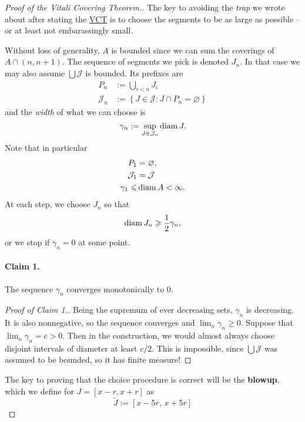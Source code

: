 \begin{proof}[Proof of the Vitali Covering Theorem.]
    The key to avoiding the \emph{trap} we wrote about after stating the \hyperlink{VitaliCoveringTheorem}{VCT} is to choose the segments to be as large as possible -- or at least not embarassingly small.

    Without loss of generality, \( A \) is bounded since we can sum the coverings of \( A \cap (n,n+1) \). The sequence of segments we pick is denoted \( J_n \). In that case we may also assume \( \bigcup \mathcal{J} \) is bounded. Its prefixes are
    \begin{align*}
        P_n &:= \bigcup_{i < n} J_i \\
        \mathcal{J}_n &:= \left\{ J \in \mathcal{J} : J \cap P_n = \varnothing \right\}
    \end{align*}
   and the \emph{width} of what we can choose is
    \[ 
        \gamma_n := \sup_{J \in \mathcal{J}_n} \operatorname{diam} J.
    \]
    Note that in particular
    \begin{align*}
        P_1 &= \varnothing, \\
        \mathcal{J}_1 &= \mathcal{J} \\
        \gamma_1 \leqslant &\operatorname{diam} A < \infty.
    \end{align*}
    At each step, we choose \( J_n \) so that
    \[ 
       \operatorname{diam} J_n \geqslant \frac{1}{2}\gamma_n,
   \]
   or we stop if \( \gamma_n = 0 \) at some point.
\paragraph{Claim 1.} The sequence \( \gamma_n \) converges monotonically to \( 0 \).
\begin{proof}[Proof of Claim 1.] Being the supremum of ever decreasing sets, \( \gamma_n \) is decreasing. It is also nonnegative, so the sequence converges and \( \lim_n \gamma_n \geqslant 0 \). Suppose that \( \lim_n \gamma_n = c > 0 \). Then in the construction, we would almost always choose disjoint intervals of diameter at least \( c/2 \). This is impossible, since \( \bigcup \mathcal{J} \) was assumed to be bounded, so it has finite measure!
\end{proof}

   The key to proving that the choice procedure is correct will be the \textbf{blowup}, which we define for \( J = [x-r,x+r] \) as
   \[ 
       \widetilde{J} :=  [x - 5r,\, x + 5r]
  \]

\end{proof}
